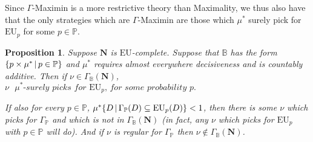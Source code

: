\documentclass[a4paper]{article}
\newtheorem{proposition}[theorem]{Proposition}
\newcommand\N{\mathbf{N}}
\renewcommand\S{\mathcal{S}}
\renewcommand\P{\mathbb{P}} %
\renewcommand\c{\mathsf{c}} %
\newcommand\EU{\mathrm{EU}}
\newcommand\Maximality{\mathrm{Max}}
\newcommand\Maximin{\Gamma}
\newcommand{\IB}{\mathbb{B}}
\newcommand{\IP}{\P}
\newcommand{\todoinfo}[2][]{\todo[backgroundcolor=orange!80,bordercolor=black,linecolor=gray!80, #1,inline,caption={}]{#2}}
\renewcommand{\color}[1]{}
\newcommand\SetDelimiter[1][]{
	\nonscript\,#1\vert \allowbreak \nonscript\,\mathopen{}}
\providecommand\given{\SetDelimiter}
\newenvironment{CCM rewritten}
{\begingroup\color{blue}} %
{\endgroup}              %
\begin{document}
{\color{violet}Since $\Gamma$-Maximin is a more restrictive theory than Maximality, we thus also have that the only strategies which are $\Gamma$-Maximin are those which $\mu^*$ surely pick for $\EU_p$ for some $p\in\IP$. 
	\begin{proposition}\label{thm:gamma-nu}Suppose $\N$ is $\EU$-complete. Suppose that 
		$\IB$ has the form $\{p\times \mu^*\given p\in \IP\}$ and $\mu^*$ requires almost everywhere decisiveness and is countably additive. Then if $\nu \in \Maximin_\IB(\N)$, $ \nu \textit{ $\mu^*$-surely picks for $\EU_p$, for some probability $p$.}$
		
		If also for every $p\in\IP$, $\mu^*\{D\given \Maximin_\IP(D)\subseteq \EU_p(D)\}<1$, then there is some $\nu$ which picks for $\Maximin_\IP$ and which is not in $\Maximin_\IB(\N)$ (in fact, any $\nu$ which picks for $\EU_p$ with $p\in\IP$ will do).  And if $\nu$ is regular for $\Maximin_\IP$ then $\nu\notin \Maximin_\IB(\N)$. 
	\end{proposition}
}


\begin{comment}
	If you take $\N$ to consist of all probabilistic picking strategies, then we in fact do not need the requirement that $\mu^*$ requires almost everywhere decisiveness (or countable additivity). 
The conclusions of \cref{thm:max-nu,thm:max-nu-reg-nec} hold without the assumption that $\mu^*$ requires almost everywhere decisiveness or countably additive if we instead assume that $\N$ is convex, i.e., that it contains any (finite) mixtures of members of $\N$. 
\begin{proposition}Suppose that $\N$ is $\EU$-complete and convex.\todoinfo{Actually we should be careful: if $\N$ is convex but not closed then it is non-compact and our decision theories aren't even defined for it!!!}
	
	Let $\IB$ have the form $\{p\times \mu^*\given p\in\IP\}$
	
	If for every $p\in\IP$, $\mu^*\{D\given \Maximality_\IP(D)\subseteq\EU_p(D)\}< 1$ and $\nu$ is a regular picking strategy for $\Maximality_\IP$, then $\nu\notin\Maximality_\IB(\N)$.
%	
%	
%
\end{proposition}
\end{comment}
\end{document}
